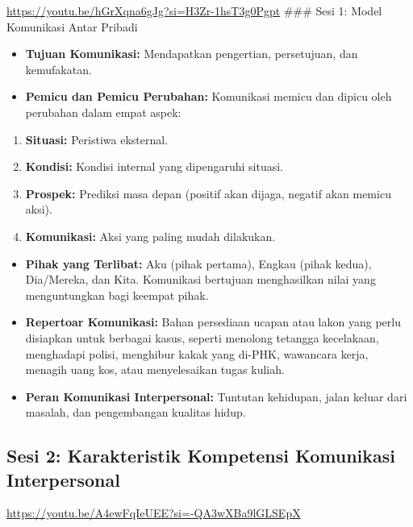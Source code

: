 \documentclass[
  letterpaper,
  DIV=11,
  numbers=noendperiod]{scrreprt}
\providecommand{\tightlist}{%
  \setlength{\itemsep}{0pt}\setlength{\parskip}{0pt}}
\begin{document}
\url{https://youtu.be/hGrXqna6gJg?si=H3Zr-1hsT3g0Pgpt} \#\#\# Sesi 1:
Model Komunikasi Antar Pribadi

\begin{itemize}
\tightlist
\item
  \textbf{Tujuan Komunikasi:} Mendapatkan pengertian, persetujuan, dan
  kemufakatan.
\item
  \textbf{Pemicu dan Pemicu Perubahan:} Komunikasi memicu dan dipicu
  oleh perubahan dalam empat aspek:
\end{itemize}

\begin{enumerate}
\def\labelenumi{\arabic{enumi}.}
\tightlist
\item
  \textbf{Situasi:} Peristiwa eksternal.
\item
  \textbf{Kondisi:} Kondisi internal yang dipengaruhi situasi.
\item
  \textbf{Prospek:} Prediksi masa depan (positif akan dijaga, negatif
  akan memicu aksi).
\item
  \textbf{Komunikasi:} Aksi yang paling mudah dilakukan.
\end{enumerate}

\begin{itemize}
\tightlist
\item
  \textbf{Pihak yang Terlibat:} Aku (pihak pertama), Engkau (pihak
  kedua), Dia/Mereka, dan Kita. Komunikasi bertujuan menghasilkan nilai
  yang menguntungkan bagi keempat pihak.
\item
  \textbf{Repertoar Komunikasi:} Bahan persediaan ucapan atau lakon yang
  perlu disiapkan untuk berbagai kasus, seperti menolong tetangga
  kecelakaan, menghadapi polisi, menghibur kakak yang di-PHK, wawancara
  kerja, menagih uang kos, atau menyelesaikan tugas kuliah.
\item
  \textbf{Peran Komunikasi Interpersonal:} Tuntutan kehidupan, jalan
  keluar dari masalah, dan pengembangan kualitas hidup.
\end{itemize}

\subsection{Sesi 2: Karakteristik Kompetensi Komunikasi
Interpersonal}\label{sesi-2-karakteristik-kompetensi-komunikasi-interpersonal}

\url{https://youtu.be/A4ewFqIeUEE?si=-QA3wXBa9lGLSEpX}
\end{document}
